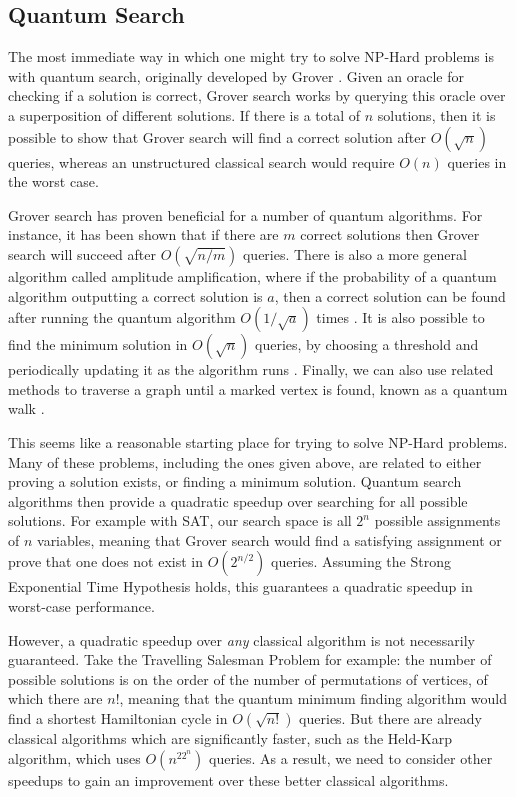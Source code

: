 \subsection{Quantum Search}

The most immediate way in which one might try to solve NP-Hard problems is with quantum search, originally developed by Grover \cite{grover96}. Given an oracle for checking if a solution is correct, Grover search works by querying this oracle over a superposition of different solutions. If there is a total of $n$ solutions, then it is possible to show that Grover search will find a correct solution after $O(\sqrt{n})$ queries, whereas an unstructured classical search would require $O(n)$ queries in the worst case.

Grover search has proven beneficial for a number of quantum algorithms. For instance, it has been shown that if there are $m$ correct solutions then Grover search will succeed after $O(\sqrt{n/m})$ queries. There is also a more general algorithm called amplitude amplification, where if the probability of a quantum algorithm outputting a correct solution is $a$, then a correct solution can be found after running the quantum algorithm $O(1/\sqrt{a})$ times \cite{brassard2002}. It is also possible to find the minimum solution in $O(\sqrt{n})$ queries, by choosing a threshold and periodically updating it as the algorithm runs \cite{durr1996}. Finally, we can also use related methods to traverse a graph until a marked vertex is found, known as a quantum walk \cite{childs2003}.

This seems like a reasonable starting place for trying to solve NP-Hard problems. Many of these problems, including the ones given above, are related to either proving a solution exists, or finding a minimum solution. Quantum search algorithms then provide a quadratic speedup over searching for all possible solutions. For example with SAT, our search space is all $2^n$ possible assignments of $n$ variables, meaning that Grover search would find a satisfying assignment or prove that one does not exist in $O(2^{n/2})$ queries. Assuming the Strong Exponential Time Hypothesis holds, this guarantees a quadratic speedup in worst-case performance.

However, a quadratic speedup over \textit{any} classical algorithm is not necessarily guaranteed. Take the Travelling Salesman Problem for example: the number of possible solutions is on the order of the number of permutations of vertices, of which there are $n!$, meaning that the quantum minimum finding algorithm would find a shortest Hamiltonian cycle in $O(\sqrt{n!})$ queries. But there are already classical algorithms which are significantly faster, such as the Held-Karp algorithm, which uses $O(n^22^n)$ queries. As a result, we need to consider other speedups to gain an improvement over these better classical algorithms.

